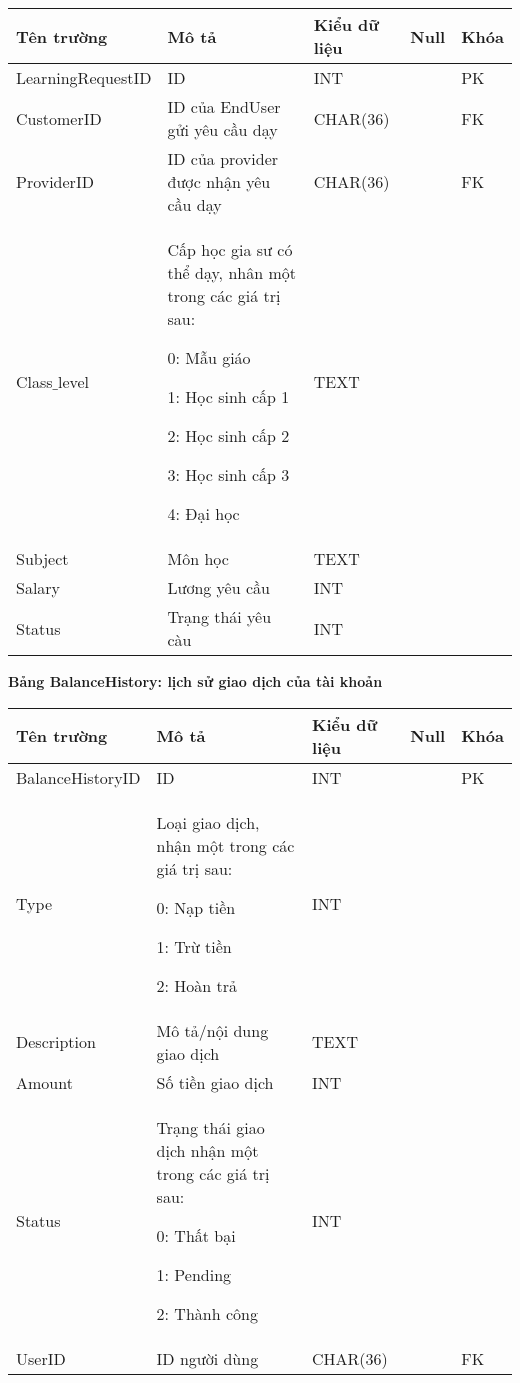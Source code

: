\documentclass[12pt,a4paper]{report}
\begin{document}
\begin{center}
\begin{tabular}{|>{\raggedright\arraybackslash}m{3.5cm}|>{\raggedright\arraybackslash}m{5cm}|>{\raggedright\arraybackslash}m{3.6cm}| >{\centering\arraybackslash}m{1cm}| >{\centering\arraybackslash}m{1cm}|}
\hline 
\textbf{Tên trường} & \textbf{Mô tả} & \textbf{Kiểu dữ liệu} & \textbf{Null} & \textbf{Khóa} \\ 
\hline 
LearningRequestID & ID  & INT &  & PK \\ 
\hline 
CustomerID & ID của EndUser gửi yêu cầu dạy & CHAR(36) &  & FK \\ 
\hline 
ProviderID & ID của provider được nhận yêu cầu dạy & CHAR(36) &  & FK \\ 
\hline 
Class$\_$level & Cấp học gia sư có thể dạy, nhân một trong các giá trị sau:

0: Mẫu giáo

1: Học sinh cấp 1

2: Học sinh cấp 2

3: Học sinh cấp 3

4: Đại học & TEXT &  &  \\ 
\hline 
Subject & Môn học & TEXT &  &  \\
\hline 
Salary & Lương yêu cầu & INT &  &  \\  
\hline 
Status & Trạng thái yêu càu & INT &  &  \\ 
\hline 
\end{tabular} 
\end{center}

\newpage
\textbf{Bảng BalanceHistory: lịch sử giao dịch của tài khoản}
\begin{center}
 \begin{tabular}{|>{\raggedright\arraybackslash}m{3.5cm}|>{\raggedright\arraybackslash}m{5cm}|>{\raggedright\arraybackslash}m{3.6cm}| >{\centering\arraybackslash}m{1cm}| >{\centering\arraybackslash}m{1cm}|}
\hline 
\textbf{Tên trường} & \textbf{Mô tả} & \textbf{Kiểu dữ liệu} & \textbf{Null} & \textbf{Khóa} \\ 
\hline 
BalanceHistoryID & ID & INT &  & PK \\ 
\hline 
Type & Loại giao dịch, nhận một trong các giá trị sau: 

0: Nạp tiền

1: Trừ tiền

2: Hoàn trả& INT &  &  \\ 
\hline 
Description & Mô tả/nội dung giao dịch & TEXT &  &  \\ 
\hline 
Amount & Số tiền giao dịch & INT &  &  \\ 
\hline 
Status & Trạng thái giao dịch nhận một trong các giá trị sau:

0: Thất bại

1: Pending

2: Thành công & INT &  &  \\ 
\hline 
UserID & ID người dùng & CHAR(36) &  & FK \\ 
\hline 
\end{tabular}
 \end{center} 
 
\end{document}
